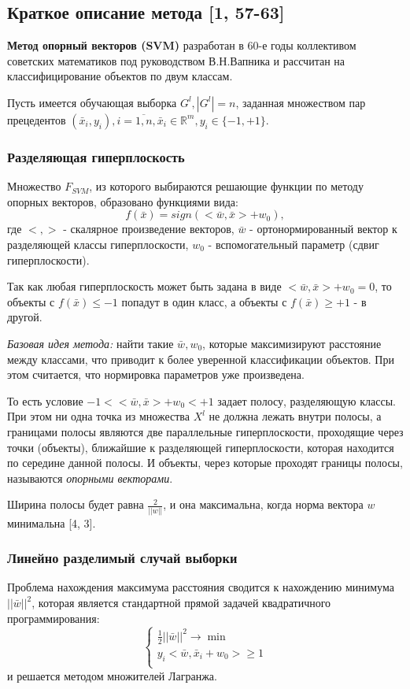 
\subsection{Краткое описание метода [1, 57-63]}
\textbf{Метод опорный векторов (SVM)} разработан в 60-е годы коллективом советских математиков под руководством В.Н.Вапника и рассчитан на классифицирование объектов по двум классам.

Пусть имеется обучающая выборка $G^l,|G^l|=n$, заданная множеством пар прецедентов $(\bar{x}_i,y_i),i=\overline{1,n},\bar{x}_i\in\mathbb{R}^m,y_i\in\{-1,+1\}$.

\subsubsection{Разделяющая гиперплоскость}
Множество $F_{SVM}$, из которого выбираются решающие функции по методу опорных векторов, образовано функциями вида:
\begin{equation}
    f(\bar{x})=sign(<\bar{w},\bar{x}>+w_0),
\end{equation}
где $<,>$ - скалярное произведение векторов, $\bar{w}$ - ортонормированный вектор к разделяющей классы гиперплоскости, $w_0$ - вспомогательный параметр (сдвиг гиперплоскости).

Так как любая гиперплоскость может быть задана в виде $<\bar{w},\bar{x}>+w_0=0$, то объекты с $f(\bar{x})\leq-1$ попадут в один класс, а объекты с $f(\bar{x})\geq+1$ - в другой.

\textit{Базовая идея метода:} найти такие $\bar{w},w_0$, которые максимизируют расстояние между классами, что приводит к более уверенной классификации объектов. При этом считается, что нормировка параметров уже произведена.

То есть условие $-1<<\bar{w},\bar{x}>+w_0<+1$ задает полосу, разделяющую классы. При этом ни одна точка из множества $X^l$ не должна лежать внутри полосы, а границами полосы являются две параллельные гиперплоскости, проходящие через точки (объекты), ближайшие к разделяющей гиперплоскости, которая находится по середине данной полосы. И объекты, через которые проходят границы полосы, называются \textit{опорными векторами}.

Ширина полосы будет равна $\frac{2}{||w||}$, и она максимальна, когда норма вектора $w$ минимальна [4, 3].

\subsubsection{Линейно разделимый случай выборки}
Проблема нахождения максимума расстояния сводится к нахождению минимума $||\bar{w}||^2$, которая является стандартной прямой задачей квадратичного программирования:
\begin{equation}
    \left\{
    \begin{array}{ll}
        \frac{1}{2}||\bar{w}||^2\rightarrow\min\\
        y_i<\bar{w},\bar{x}_i+w_0>\geq1\\
    \end{array}
    \right.
\end{equation}
и решается методом множителей Лагранжа.

